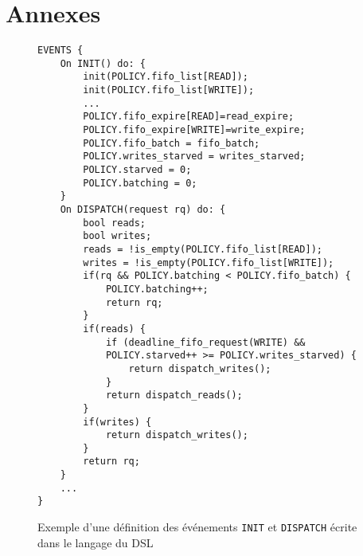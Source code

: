 \appendix
\section{Annexes}
\label{appendix}
\begin{figure}[h!t]
    \centering
    \begin{lstlisting}[language=Phaistos]
EVENTS {
    On INIT() do: {
        init(POLICY.fifo_list[READ]); 
        init(POLICY.fifo_list[WRITE]);
        ...
        POLICY.fifo_expire[READ]=read_expire;
        POLICY.fifo_expire[WRITE]=write_expire; 
        POLICY.fifo_batch = fifo_batch;
        POLICY.writes_starved = writes_starved;
        POLICY.starved = 0;
        POLICY.batching = 0;
    }
    On DISPATCH(request rq) do: {
        bool reads; 
        bool writes;
        reads = !is_empty(POLICY.fifo_list[READ]);
        writes = !is_empty(POLICY.fifo_list[WRITE]);
        if(rq && POLICY.batching < POLICY.fifo_batch) {
            POLICY.batching++;
            return rq;
        }
        if(reads) {
            if (deadline_fifo_request(WRITE) &&
            POLICY.starved++ >= POLICY.writes_starved) {
                return dispatch_writes();
            }
            return dispatch_reads();
        }
        if(writes) {
            return dispatch_writes();
        }
        return rq; 
    }
    ...
}
    \end{lstlisting}
    \caption{Exemple d'une définition des événements \texttt{INIT} et \texttt{DISPATCH} écrite dans le langage du DSL}
    \label{fig:event-code}
\end{figure}
  